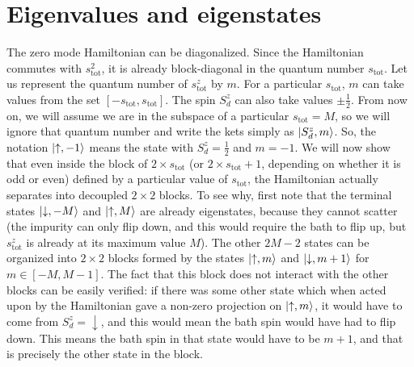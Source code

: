\documentclass{revtex4-2}
\begin{document}
\section{Eigenvalues and eigenstates}
The zero mode Hamiltonian can be diagonalized. Since the Hamiltonian commutes with \(s_\text{tot}^2\), it is already block-diagonal in the quantum number \(s_\text{tot}\). Let us represent the quantum number of \(s_\text{tot}^z\) by \(m\). For a particular \(s_\text{tot}\), \(m\) can take values from the set \(\left[-s_\text{tot}, s_\text{tot}\right] \). The spin \(S_d^z\) can also take values \(\pm \frac{1}{2}\). From now on, we will assume we are in the subspace of a particular \(s_\text{tot} = M\), so we will ignore that quantum number and write the kets simply as \(\ket{S_d^z, m}\). So, the notation \(\ket{\uparrow,-1}\) means the state with \(S_d^z = \frac{1}{2}\) and \(m = -1\). We will now show that even inside the block of \(2\times s_\text{tot}\) (or \(2\times s_\text{tot} + 1\), depending on whether it is odd or even) defined by a particular value of \(s_\text{tot}\), the Hamiltonian actually separates into decoupled \(2\times 2\) blocks. To see why, first note that the terminal states \(\ket{\downarrow, -M}\) and \(\ket{\uparrow, M}\) are already eigenstates, because they cannot scatter (the impurity can only flip down, and this would require the bath to flip up, but \(s^z_\text{tot}\) is already at its maximum value \(M\)). The other \(2M - 2\) states can be organized into \(2\times 2\) blocks formed by the states \(\ket{\uparrow, m}\) and \(\ket{\downarrow, m+1}\) for \(m \in \left[-M, M-1\right] \). The fact that this block does not interact with the other blocks can be easily verified: if there was some other state which when acted upon by the Hamiltonian gave a non-zero projection on \(\ket{\uparrow, m}\), it would have to come from \(S_d^z = \downarrow\), and this would mean the bath spin would have had to flip down. This means the bath spin in that state would have to be \(m+1\), and that is precisely the other state in the block. 
\end{document}
